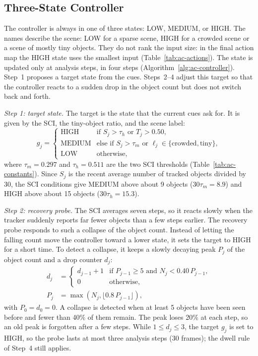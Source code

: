 \subsection{Three-State Controller}\label{sec:ac-states}
The controller is always in one of three states: LOW, MEDIUM, or HIGH. The names describe the scene: LOW for a sparse scene, HIGH for a crowded scene or a scene of mostly tiny objects. They do not rank the input size: in the final action map the HIGH state uses the smallest input (Table~\ref{tab:ac-actions}). The state is updated only at analysis steps, in four steps (Algorithm~\ref{alg:ac-controller}). Step~1 proposes a target state from the cues. Steps~2--4 adjust this target so that the controller reacts to a sudden drop in the object count but does not switch back and forth.

\emph{Step 1: target state.} The target is the state that the current cues ask for. It is given by the SCI, the tiny-object ratio, and the scene label:
\begin{equation}
g_j=\begin{cases}
\text{HIGH}   & \text{if } S_j>\tau_h \text{ or } T_j>0.50,\\
\text{MEDIUM} & \text{else if } S_j>\tau_m \text{ or } \ell_j\in\{\text{crowded},\text{tiny}\},\\
\text{LOW}    & \text{otherwise,}
\end{cases}
\label{eq:ac-target}
\end{equation}
where $\tau_m=0.297$ and $\tau_h=0.511$ are the two SCI thresholds (Table~\ref{tab:ac-constants}). Since $S_j$ is the recent average number of tracked objects divided by 30, the SCI conditions give MEDIUM above about 9 objects ($30\tau_m=8.9$) and HIGH above about 15 objects ($30\tau_h=15.3$).

\emph{Step 2: recovery probe.} The SCI averages seven steps, so it reacts slowly when the tracker suddenly reports far fewer objects than a few steps earlier. The recovery probe responds to such a collapse of the object count. Instead of letting the falling count move the controller toward a lower state, it sets the target to HIGH for a short time. To detect a collapse, it keeps a slowly decaying peak $P_j$ of the object count and a drop counter $d_j$:
\begin{align}
d_j&=\begin{cases}
d_{j-1}+1 & \text{if } P_{j-1}\ge5 \text{ and } N_j<0.40\,P_{j-1},\\
0         & \text{otherwise,}
\end{cases}\label{eq:ac-drop}\\
P_j&=\max\left(N_j,\lfloor 0.8\,P_{j-1}\rfloor\right),\label{eq:ac-peak}
\end{align}
with $P_0=d_0=0$. A collapse is detected when at least 5 objects have been seen before and fewer than 40\% of them remain. The peak loses 20\% at each step, so an old peak is forgotten after a few steps. While $1\le d_j\le3$, the target $g_j$ is set to HIGH, so the probe lasts at most three analysis steps (30 frames); the dwell rule of Step~4 still applies.

